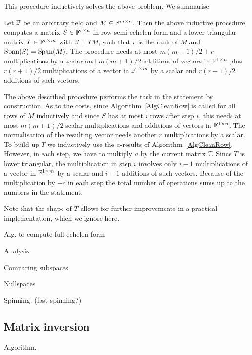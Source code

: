 This procedure inductively solves the above problem. We summarise:

\begin{Prop}
Let $\mathbb{F}$ be an arbitrary field and $M \in \mathbb{F}^{m \times n}$. Then the
above inductive procedure computes a matrix $S \in \mathbb{F}^{r \times n}$
in row semi echelon form and a lower triangular matrix 
$T \in \mathbb{F}^{r \times m}$ with $S=TM$,
such that $r$ is the rank of $M$ and $\Span(S) = \Span(M)$.
The procedure needs at most $m(m+1)/2+r$ multiplications by a scalar
and $m(m+1)/2$ additions of vectors in $\mathbb{F}^{1 \times n}$ plus
$r(r+1)/2$ multiplications of a vector in $\mathbb{F}^{1 \times m}$ by a scalar
and $r(r-1)/2$ additions of such vectors.
\end{Prop}
\Proof The above described procedure performs the task in the
statement by construction. As to the costs, since
Algorithm~\ref{AlgCleanRow} is called for all rows of $M$
inductively and since $S$ has at most $i$ rows after step $i$,
this needs at most $m(m+1)/2$ scalar multiplications and additions
of vectors in $\mathbb{F}^{1 \times n}$. The normalisation of the
resulting vector needs another $r$ multiplications by a scalar.
To build up $T$ we inductively use the $a$-results of
Algorithm~\ref{AlgCleanRow}. However, in each step, we have to multiply
$a$ by the current matrix $T$. Since $T$ is lower triangular, the
multiplication in step $i$ involves only $i-1$ multiplications of
a vector in $\mathbb{F}^{1 \times m}$ by a scalar and $i-1$ additions of
such vectors. Because of the multiplication by $-c$ in each step
the total number of operations sums up to the numbers in the 
statement. 
\ProofEnd

\begin{Rem}
Note that the shape of $T$ allows for further
improvements in a practical implementation, which we ignore here.
\end{Rem}

\vspace*{2cm}
Alg. to compute full-echelon form

Analysis

Comparing subspaces

Nullspaces

Spinning. (fast spinning?)


\subsection{Matrix inversion}

Algorithm.

